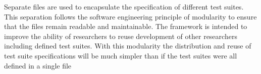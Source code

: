 Separate files are used to encapsulate the specification of different test suites.
This separation follows the software engineering principle of modularity to ensure that the files remain readable and maintainable.
The framework is intended to improve the ability of researchers to reuse development of other researchers including defined test suites.
With this modularity the distribution and reuse of test suite specifications will be much simpler than if the test suites were all defined in a single file


% 

